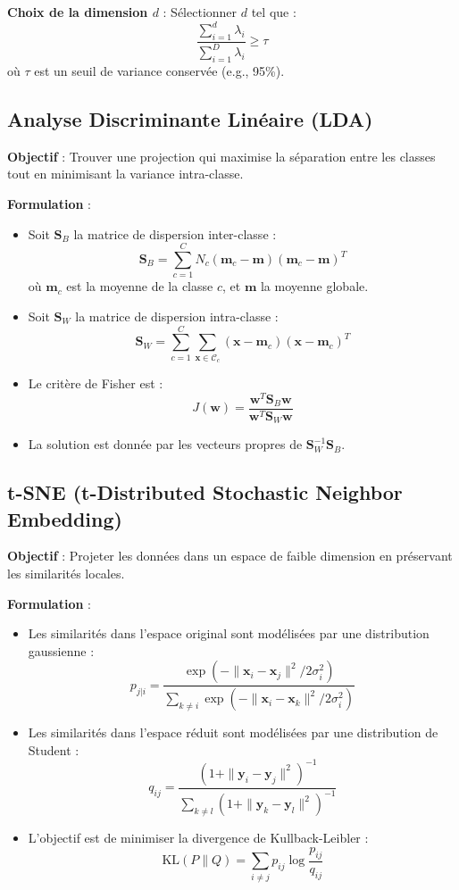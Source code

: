 \documentclass[a4paper,portrait]{article}
\begin{document}
\begin{multicols}{2}
\textbf{Choix de la dimension \( d \)} : Sélectionner \( d \) tel que :
\[
\frac{\sum_{i=1}^d \lambda_i}{\sum_{i=1}^D \lambda_i} \geq \tau
\]
où \( \tau \) est un seuil de variance conservée (e.g., 95\%).



\subsection{Analyse Discriminante Linéaire (LDA)}

\textbf{Objectif} : Trouver une projection qui maximise la séparation entre les classes tout en minimisant la variance intra-classe.

\textbf{Formulation} :
\begin{itemize}
    \item Soit \( \mathbf{S}_B \) la matrice de dispersion inter-classe :
    \[
    \mathbf{S}_B = \sum_{c=1}^C N_c (\mathbf{m}_c - \mathbf{m})(\mathbf{m}_c - \mathbf{m})^T
    \]
    où \( \mathbf{m}_c \) est la moyenne de la classe \( c \), et \( \mathbf{m} \) la moyenne globale.
    \item Soit \( \mathbf{S}_W \) la matrice de dispersion intra-classe :
    \[
    \mathbf{S}_W = \sum_{c=1}^C \sum_{\mathbf{x} \in \mathcal{C}_c} (\mathbf{x} - \mathbf{m}_c)(\mathbf{x} - \mathbf{m}_c)^T
    \]
    \item Le critère de Fisher est :
    \[
    J(\mathbf{w}) = \frac{\mathbf{w}^T \mathbf{S}_B \mathbf{w}}{\mathbf{w}^T \mathbf{S}_W \mathbf{w}}
    \]
    \item La solution est donnée par les vecteurs propres de \( \mathbf{S}_W^{-1} \mathbf{S}_B \).
\end{itemize}



\subsection{t-SNE (t-Distributed Stochastic Neighbor Embedding)}

\textbf{Objectif} : Projeter les données dans un espace de faible dimension en préservant les similarités locales.

\textbf{Formulation} :
\begin{itemize}
    \item Les similarités dans l'espace original sont modélisées par une distribution gaussienne :
    \[
    p_{j|i} = \frac{\exp(-\|\mathbf{x}_i - \mathbf{x}_j\|^2 / 2\sigma_i^2)}{\sum_{k \neq i} \exp(-\|\mathbf{x}_i - \mathbf{x}_k\|^2 / 2\sigma_i^2)}
    \]
    \item Les similarités dans l'espace réduit sont modélisées par une distribution de Student :
    \[
    q_{ij} = \frac{(1 + \|\mathbf{y}_i - \mathbf{y}_j\|^2)^{-1}}{\sum_{k \neq l} (1 + \|\mathbf{y}_k - \mathbf{y}_l\|^2)^{-1}}
    \]
    \item L'objectif est de minimiser la divergence de Kullback-Leibler :
    \[
    \text{KL}(P \| Q) = \sum_{i \neq j} p_{ij} \log \frac{p_{ij}}{q_{ij}}
    \]
\end{itemize}


\end{multicols}
\end{document}
